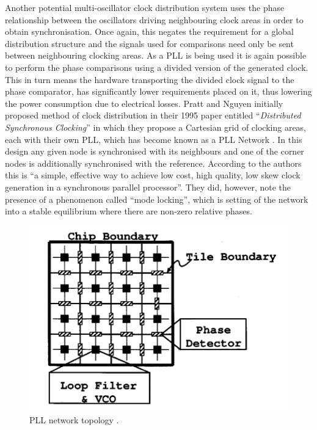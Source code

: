 Another potential multi-oscillator clock distribution system uses the phase relationship between the oscillators driving neighbouring clock areas in order to obtain synchronisation. Once again, this negates the requirement for a global distribution structure and the signals used for comparisons need only be sent between neighbouring clocking areas. As a \ac{PLL} is being used it is again possible to perform the phase comparisons using a divided version of the generated clock. This in turn means the hardware transporting the divided clock signal to the phase comparator, has significantly lower requirements placed on it, thus lowering the power consumption due to electrical losses. Pratt and Nguyen initially proposed method of clock distribution in their 1995 paper entitled ``\textit{Distributed Synchronous Clocking}'' in which they propose a Cartesian grid of clocking areas, each with their own \ac{PLL}, which has become known as a \ac{PLL} Network \cite{pratt1995distributed}. In this design any given node is synchronised with its neighbours and one of the corner nodes is additionally synchronised with the reference. According to the authors this is ``a simple, effective way to achieve low cost, high quality, low skew clock generation in a synchronous parallel processor''. They did, however, note the presence of a phenomenon called ``mode locking'', which is setting of the network into a stable equilibrium where there are non-zero relative phases.

\begin{figure}[h]
	\centering
	\includegraphics[scale=0.7]{../gutnik2000active}
	\caption[PLL network topology ]{PLL network topology \cite{gutnik2000active}.}
	\label{fig:gutnik2000active}
\end{figure}

